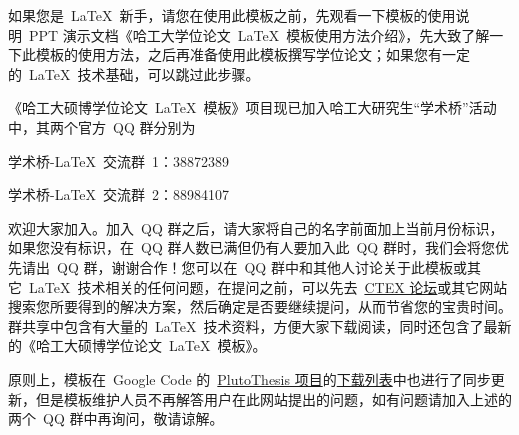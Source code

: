 

如果您是~\LaTeX~新手，请您在使用此模板之前，先观看一下模板的使用说明~PPT 演示文档《哈工大学位论文~\LaTeX~模板使用方法介绍》，先大致了解一下此模板的使用方法，之后再准备使用此模板撰写学位论文；如果您有一定的~\LaTeX~技术基础，可以跳过此步骤。

《哈工大硕博学位论文~\LaTeX~模板》项目现已加入哈工大研究生“学术桥”活动中，其两个官方~QQ 群分别为

\centerline{学术桥-\LaTeX~交流群~1：38872389}
\centerline{学术桥-\LaTeX~交流群~2：88984107}
\noindent 欢迎大家加入。加入~QQ 群之后，请大家将自己的名字前面加上当前月份标识，如果您没有标识，在~QQ 群人数已满但仍有人要加入此~QQ 群时，我们会将您优先请出~QQ 群，谢谢合作！您可以在~QQ 群中和其他人讨论关于此模板或其它~\LaTeX~技术相关的任何问题，在提问之前，可以先去~\href{http://bbs.ctex.org/}{CTEX 论坛}或其它网站搜索您所要得到的解决方案，然后确定是否要继续提问，从而节省您的宝贵时间。群共享中包含有大量的~\LaTeX~技术资料，方便大家下载阅读，同时还包含了最新的《哈工大硕博学位论文~\LaTeX~模板》。

原则上，模板在~Google Code 的~\href{http://code.google.com/p/plutothesis/}{PlutoThesis 项目}的\href{http://code.google.com/p/plutothesis/downloads/list}{下载列表}中也进行了同步更新，但是模板维护人员不再解答用户在此网站提出的问题，如有问题请加入上述的两个~QQ 群中再询问，敬请谅解。
